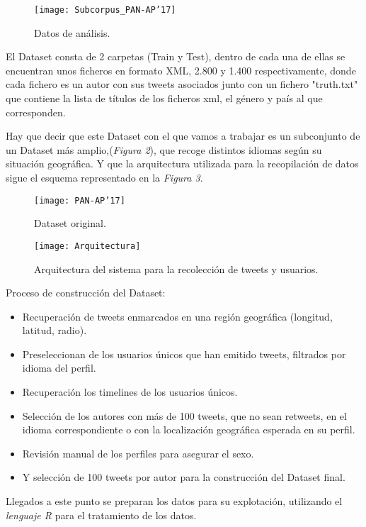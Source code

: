 \documentclass[11pt,a4paper]{article}
\begin{document}
\begin{figure}[htb]
\centering
\texttt{[image: Subcorpus\_PAN-AP'17]}
\caption{Datos de análisis.} \label{fig:Subcorpus_PAN-AP'17}
\end{figure}

El Dataset consta de 2 carpetas (Train y Test), dentro de cada una de ellas se encuentran unos ficheros en formato XML, 2.800 y 1.400 respectivamente, donde cada fichero es un autor con sus tweets asociados junto con un fichero "truth.txt" que contiene la lista de títulos de los ficheros xml, el género y país al que corresponden.

Hay que decir que este Dataset con el que vamos a trabajar es un subconjunto de un Dataset más amplio,({\em Figura 2}), que recoge distintos idiomas según su situación geográfica.
Y que la arquitectura utilizada para la recopilación de datos sigue el esquema representado en la {\em Figura 3}.

\begin{figure}[htb]
\centering
\texttt{[image: PAN-AP'17]}
\caption{Dataset original.} \label{fig:PAN-AP'17}
\end{figure}

\begin{figure}[htb]
\centering
\texttt{[image: Arquitectura]}
\caption{Arquitectura del sistema para la recolección de tweets y usuarios.} \label{fig:Arquitectura}
\end{figure}

Proceso de construcción del Dataset:
\begin{itemize}
  \item Recuperación de tweets enmarcados en una región geográfica  (longitud, latitud, radio). 
  \item Preseleccionan de los usuarios únicos que han emitido tweets, filtrados por idioma del perfil.
  \item Recuperación los timelines de los usuarios únicos.
  \item Selección de los autores con más de 100 tweets, que no sean retweets, en el idioma correspondiente o con la localización geográfica esperada en su perfil.
  \item Revisión manual de los perfiles para asegurar el sexo.
  \item Y selección de 100 tweets por autor para la construcción del Dataset final.
\end{itemize}

Llegados a este punto se preparan los datos para su explotación,  utilizando el {\em lenguaje R} para el tratamiento de los datos.
\end{document}
